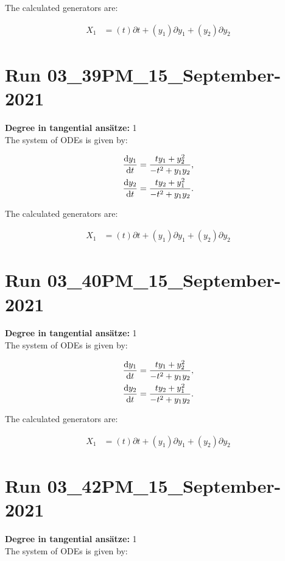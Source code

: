 \noindent The calculated generators are:

\begin{align*}
X_{1}&=\left( t \right)\partial t+\left( y_{1} \right)\partial y_{1}+\left( y_{2} \right)\partial y_{2}\end{align*}
\section*{Run 03\_39PM\_15\_September-2021}
\textbf{Degree in tangential ansätze:}	1\\
The system of ODEs is given by:

\begin{align*}
\dv{y_{1}}{t}&=\frac{t y_{1} + y_{2}^{2}}{- t^{2} + y_{1} y_{2}},\\
\dv{y_{2}}{t}&=\frac{t y_{2} + y_{1}^{2}}{- t^{2} + y_{1} y_{2}}.\\
\end{align*}

\noindent The calculated generators are:

\begin{align*}
X_{1}&=\left( t \right)\partial t+\left( y_{1} \right)\partial y_{1}+\left( y_{2} \right)\partial y_{2}\end{align*}
\section*{Run 03\_40PM\_15\_September-2021}
\textbf{Degree in tangential ansätze:}	1\\
The system of ODEs is given by:

\begin{align*}
\dv{y_{1}}{t}&=\frac{t y_{1} + y_{2}^{2}}{- t^{2} + y_{1} y_{2}},\\
\dv{y_{2}}{t}&=\frac{t y_{2} + y_{1}^{2}}{- t^{2} + y_{1} y_{2}}.\\
\end{align*}

\noindent The calculated generators are:

\begin{align*}
X_{1}&=\left( t \right)\partial t+\left( y_{1} \right)\partial y_{1}+\left( y_{2} \right)\partial y_{2}\end{align*}
\section*{Run 03\_42PM\_15\_September-2021}
\textbf{Degree in tangential ansätze:}	1\\
The system of ODEs is given by:

